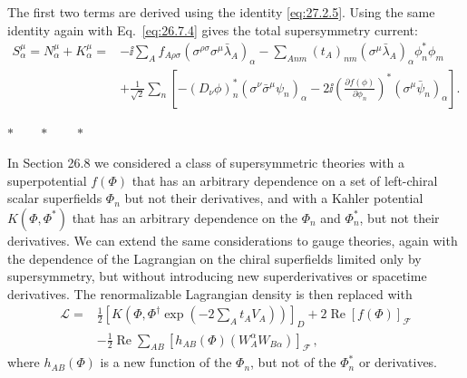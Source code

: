 The first two terms are derived using the identity \eqref{eq:27.2.5}. Using
the same identity again with Eq.~\eqref{eq:26.7.4} gives the total
supersymmetry current:
\begin{equation}
  \begin{aligned}
  S^\mu_\alpha=N^\mu_\alpha+K^\mu_\alpha
  ={}&
  -\ii\sum_Af_{A\rho\sigma}
    (\sigma^{\rho\sigma}\sigma^\mu\bar\lambda_A)_\alpha
  -\sum_{Anm}(t_A)_{nm}
    (\sigma^\mu\bar\lambda_A)_\alpha\phi_n^*\phi_m
  \\
  &+\frac1{\sqrt{2}}\sum_n\left[
    -(D_\nu\phi)_n^*
      (\sigma^\nu\bar\sigma^\mu\psi_n)_\alpha
    -2\ii\left(\frac{\partial f(\phi)}{\partial\phi_n}\right)^*
      (\sigma^\mu\bar\psi_n)_\alpha
  \right].
  \end{aligned}
  \tag{27.4.40}\label{eq:27.4.40}
\end{equation}

\begin{center}
\(\ast\qquad\ast\qquad\ast\)
\end{center}

In Section 26.8 we considered a class of supersymmetric theories with a
superpotential \(f(\Phi)\) that has an arbitrary dependence on a set of
left-chiral scalar superfields \(\Phi_n\) but not their derivatives, and with
a Kahler potential \(K(\Phi,\Phi^*)\) that has an arbitrary dependence on the
\(\Phi_n\) and \(\Phi_n^*\), but not their derivatives. We can extend the
same considerations to gauge theories, again with the dependence of the
Lagrangian on the chiral superfields limited only by supersymmetry, but
without introducing new superderivatives or spacetime derivatives. The
renormalizable Lagrangian density is then replaced with
\begin{equation}
  \begin{aligned}
  \mathcal{L}={}&
  \frac12\left[
    K\left(
      \Phi,\Phi^\dagger
      \exp\left(-2\sum_A t_AV_A\right)
    \right)
  \right]_D
  +2\operatorname{Re}[f(\Phi)]_{\mathcal{F}}
  \\
  &-\frac12\operatorname{Re}\sum_{AB}
  \left[
    h_{AB}(\Phi)
    \left(W_A^\alpha W_{B\alpha}\right)
  \right]_{\mathcal{F}}\,,
  \end{aligned}
  \tag{27.4.41}\label{eq:27.4.41}
\end{equation}
where \(h_{AB}(\Phi)\) is a new function of the \(\Phi_n\), but not of the
\(\Phi_n^*\) or derivatives.

